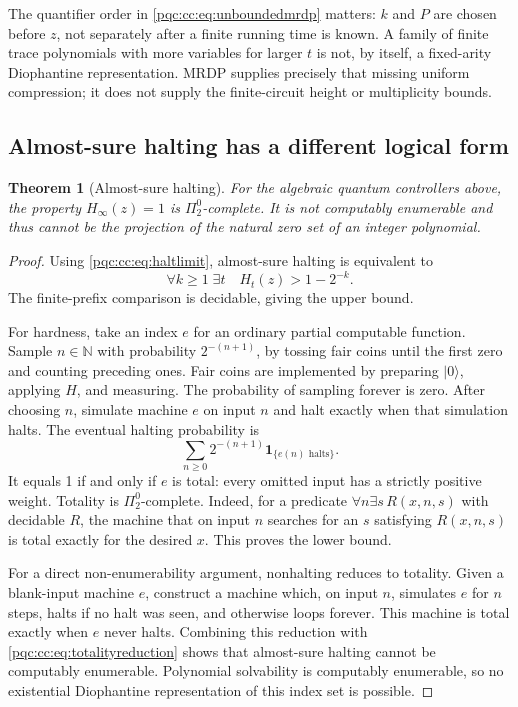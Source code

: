 \documentclass[11pt,letterpaper]{article}
\numberwithin{equation}{section}
\newtheorem{theorem}{Theorem}[section]
\theoremstyle{definition}
\theoremstyle{remark}
\newcommand{\N}{\mathbb N}
\newcommand{\ket}[1]{\lvert #1\rangle}
\begin{document}
The quantifier order in \eqref{pqc:cc:eq:unboundedmrdp} matters: $k$ and $P$ are chosen
before $z$, not separately after a finite running time is known. A family of
finite trace polynomials with more variables for larger $t$ is not, by itself,
a fixed-arity Diophantine representation. MRDP supplies precisely that missing
uniform compression; it does not supply the finite-circuit height or
multiplicity bounds.

\subsection{Almost-sure halting has a different logical form}

\begin{theorem}[Almost-sure halting]
\label{pqc:cc:thm:ast}
For the algebraic quantum controllers above, the property
$H_\infty(z)=1$ is $\Pi^0_2$-complete. It is not computably enumerable and thus
cannot be the projection of the natural zero set of an integer polynomial.
\end{theorem}
\begin{proof}
Using \eqref{pqc:cc:eq:haltlimit}, almost-sure halting is equivalent to
\begin{equation}
 \forall k\ge1\;\exists t\quad H_t(z)>1-2^{-k}.
\label{pqc:cc:eq:astquantifiers}
\end{equation}
The finite-prefix comparison is decidable, giving the upper bound.

For hardness, take an index $e$ for an ordinary partial computable function.
Sample $n\in\N$ with probability $2^{-(n+1)}$, by tossing fair coins until the
first zero and counting preceding ones. Fair coins are implemented by preparing
$\ket0$, applying $H$, and measuring. The probability of sampling forever is
zero. After choosing $n$, simulate machine $e$ on input $n$ and halt exactly
when that simulation halts. The eventual halting probability is
\begin{equation}
 \sum_{n\ge0}2^{-(n+1)}
       \mathbf1_{\{e(n)\text{ halts}\}}.
\label{pqc:cc:eq:totalityreduction}
\end{equation}
It equals 1 if and only if $e$ is total: every omitted input has a strictly
positive weight. Totality is $\Pi^0_2$-complete. Indeed, for a predicate
$\forall n\exists s\,R(x,n,s)$ with decidable $R$, the machine that on input
$n$ searches for an $s$ satisfying $R(x,n,s)$ is total exactly for the desired
$x$. This proves the lower bound.

For a direct non-enumerability argument, nonhalting reduces to totality. Given
a blank-input machine $e$, construct a machine which, on input $n$, simulates
$e$ for $n$ steps, halts if no halt was seen, and otherwise loops forever.
This machine is total exactly when $e$ never halts. Combining this reduction
with \eqref{pqc:cc:eq:totalityreduction} shows that almost-sure halting cannot be
computably enumerable. Polynomial solvability is computably enumerable, so
no existential Diophantine representation of this index set is possible.
\end{proof}
\end{document}
